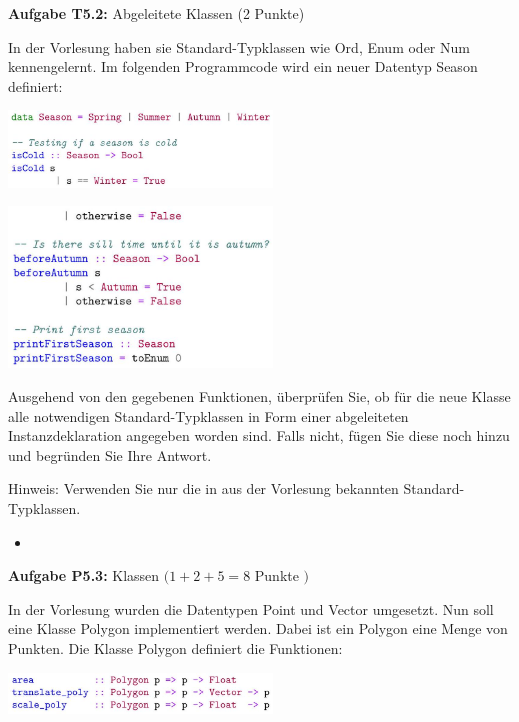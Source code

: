\newpage

\textbf{Aufgabe T5.2:} Abgeleitete Klassen (2 Punkte)

In der Vorlesung haben sie Standard-Typklassen wie Ord, Enum oder Num kennengelernt. Im folgenden Programmcode wird ein neuer 
Datentyp Season definiert:

\includegraphics[width=7cm]{2022_11_15_0a5a2eee0aef383b0ce9g-1(1)}

\includegraphics[width=7cm]{2022_11_15_0a5a2eee0aef383b0ce9g-2}

Ausgehend von den gegebenen Funktionen, überprüfen Sie, ob für die neue Klasse alle notwendigen Standard-Typklassen in Form 
einer abgeleiteten Instanzdeklaration angegeben worden sind. Falls nicht, fügen Sie diese noch hinzu und begründen Sie Ihre Antwort.

Hinweis: Verwenden Sie nur die in aus der Vorlesung bekannten Standard-Typklassen.

\newpage

\begin{itemize}
  \item []\inputminted{Haskell}{A5_2.hs}
\end{itemize}

\newpage

\textbf{Aufgabe P5.3:} Klassen $(1+2+5=8$ Punkte $)$

In der Vorlesung wurden die Datentypen Point und Vector umgesetzt. Nun soll eine Klasse Polygon implementiert werden. 
Dabei ist ein Polygon eine Menge von Punkten. Die Klasse Polygon definiert die Funktionen:

\includegraphics[width=7cm]{2022_11_15_0a5a2eee0aef383b0ce9g-2(1)}

